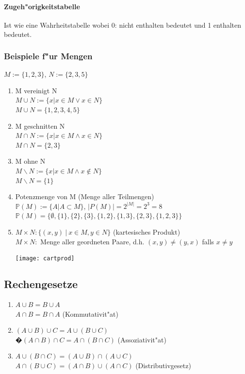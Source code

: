 \documentclass[10pt,a4paper,landscape]{article}
\newenvironment{Figure}
{\par\medskip\noindent\minipage{\linewidth}}
{\endminipage\par\medskip}
\begin{document}
\begin{multicols*}{3}
		\paragraph{Zugeh"origkeitstabelle}
		Ist wie eine Wahrheitstabelle wobei 0: nicht enthalten bedeutet und 1 enthalten bedeutet.
		
		\subsubsection{Beispiele f"ur Mengen}
		$M := \{1,2,3\}$, $N := \{2,3,5\}$
		\begin{enumerate}
			\item M vereinigt N\\$M \cup N := \{x | x \in M \lor x \in N\}$ \\ $M \cup N = \{1,2,3,4,5\}$
			
			\item M geschnitten N\\$M \cap N := \{x | x \in M \land x \in N\}$\\ $M \cap N = \{2,3\}$
			
			\item M ohne N\\$M \smallsetminus N := \{x | x \in M \land x \notin N\}$\\ $M \smallsetminus N = \{1\}$
			
			\item Potenzmenge von M (Menge aller Teilmengen)\\$\mathds{P}(M) := \{A | A \subset M\}$, $\vert P(M)\vert = 2^{\vert M \vert} = 2^3 = 8$\\ 
			$\mathds{P}(M) = \{ \emptyset, \{1\}, \{2\}, \{3\}, \{1, 2\}, \{1,3\}, \{2,3\}, \{1,2,3\}\}$
			
			\item $M \times N : \{(x,y)~|~x \in M, y \in N\}$ (kartesisches Produkt)\\
			$M \times N :$ Menge aller geordneten Paare, d.h. $(x,y) \neq (y,x)$ falls $x \neq y$
			\begin{Figure}
				\centering
				\texttt{[image: cartprod]}
			\end{Figure}
		\end{enumerate}
		
		\subsection{Rechengesetze}
		\begin{enumerate}
			\item $A \cup B = B \cup A$\\ $A \cap B = B \cap A$ (Kommutativit"at)
			\item $(A \cup B) \cup C = A \cup (B \cup C)$ \\�$(A \cap B) \cap C = A \cap (B \cap C)$ (Assoziativit"at)
			\item $A \cup (B \cap C) = (A \cup B) \cap (A \cup C) $\\ $A \cap (B \cup C) = (A \cap B) \cup (A \cap C)$ (Distributivgesetz)
		\end{enumerate}
		

\end{multicols*}
\end{document}
